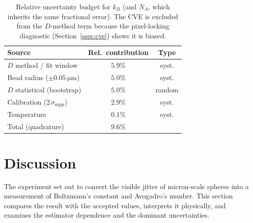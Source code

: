 \documentclass[11pt]{article}
\begin{document}
\begin{table}[h]
    \centering
    \footnotesize
    \setlength{\tabcolsep}{4pt}
    \begin{tabular}{@{}lcc@{}}
        \toprule
        Source & Rel.\ contribution & Type \\
        \midrule
        $D$ method / fit window      & $5.9\%$ & syst. \\
        Bead radius ($\pm0.05~\si{\micro\meter}$) & $5.0\%$ & syst. \\
        $D$ statistical (bootstrap)  & $5.0\%$ & random \\
        Calibration ($2\,\sigma_{\text{mpp}}$) & $2.9\%$ & syst. \\
        Temperature                  & $0.1\%$ & syst. \\
        \midrule
        Total (quadrature)           & $9.6\%$ & \\
        \bottomrule
    \end{tabular}
    \caption{Relative uncertainty budget for $k_B$ (and $N_A$, which inherits the
    same fractional error). The CVE is excluded from the $D$-method term because the
    pixel-locking diagnostic (Section~\ref{ssec:cve}) shows it is biased.}
    \label{tab:budget}
\end{table}

\FloatBarrier
\section{Discussion}
\label{Discussion}
The experiment set out to convert the visible jitter of micron-scale spheres into a
measurement of Boltzmann's constant and Avogadro's number. This section compares the
result with the accepted values, interprets it physically, and examines the
estimator dependence and the dominant uncertainties.
\end{document}
